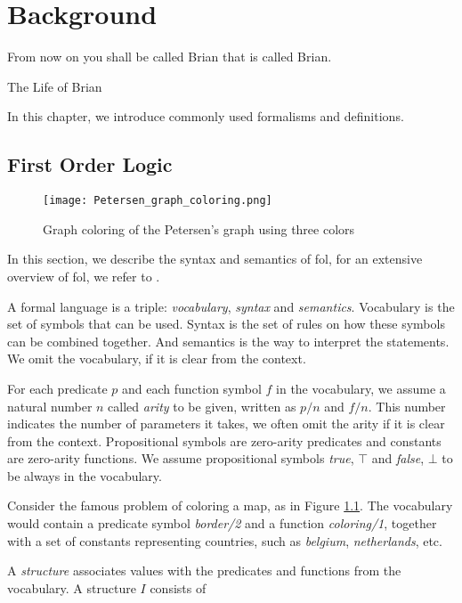 \chapter{Background} \label{ch:background}
\epigraph{From now on you shall be called Brian that is called Brian.}{The Life of Brian}
In this chapter, we introduce commonly used formalisms and definitions.

\section{First Order Logic}
\begin{figure}[t]
  \centering
  \texttt{[image: Petersen\_graph\_coloring.png]}
  \caption{Graph coloring of the Petersen's graph using three colors}
  \label{fig:petersen_coloring}
\end{figure}
In this section, we describe the syntax and semantics of \acrshort{fol},
for an extensive overview of \acrshort{fol}, we refer to \textcite{fo_overview}.

A formal language is a triple: \textit{vocabulary}, \textit{syntax} and \textit{semantics}. Vocabulary is the set of symbols that can be used. Syntax is the set of rules on how these symbols can be combined together. And semantics is the way to interpret the statements. We omit the vocabulary, if it is clear from the context.

For each predicate $p$ and each function symbol $f$ in the vocabulary, we assume a natural number $n$ called \textit{arity} to be given, written as $p/n$ and $f/n$. This number indicates the number of parameters it takes, we often omit the arity if it is clear from the context. Propositional symbols are zero-arity predicates and constants are zero-arity functions. 
We assume propositional symbols \textit{true}, $\top$ and \textit{false}, $\bot$ to be always in the vocabulary.

\begin{example}\label{example:predicates_and_functions}
  Consider the famous problem of coloring a map, as in Figure \ref{fig:petersen_coloring}. The vocabulary would contain a predicate symbol \textit{border/2} and a function \textit{coloring/1}, together with a set of constants representing countries, such as \textit{belgium}, \textit{netherlands}, etc.
\end{example}

A \textit{structure} associates values with the predicates and functions from the vocabulary. A structure $I$ consists of

